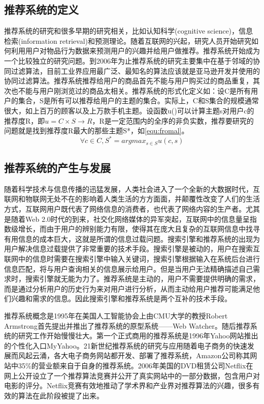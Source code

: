 	\subsection{推荐系统的定义}
	推荐系统的研究和很多早期的研究相关，比如认知科学(cognitive science)\citep{cognitive-science}，信息检索(information retrieval)和预测理论\citep{Forecast-principle}。随着互联网的兴起，研究人员开始研究如何利用用户对物品行为数据来预测用户的兴趣并给用户做推荐\citep{cf-sn}。推荐系统开始成为一个比较独立的研究问题。到2006年为止推荐系统的研究主要集中在基于邻域的协同过滤算法，目前工业界应用最广泛、最知名的算法应该就是亚马逊开发并使用的协同过滤算法\citep{Amazon-cf}。推荐系统推荐给用户的商品首先不能与用户购买过的商品重复，其次也不能与用户刚浏览过的商品太相关。推荐系统的形式化定义如：设C是所有用户的集合，S是所有可以推荐给用户的主题的集合。实际上，C和S集合的规模通常很大，如上百万的顾客以及上万款手机主题。设函数u()可以计算主题s对用户c的推荐度R，即$u=C\times S \rightarrow R$，R是一定范围内的全序的非负实数，推荐要研究的问题就是找到推荐度R最大的那些主题S*，如\autoref{equ:fromal}。
	\begin{equation}
	\forall c \in C,S^{*}=arg  max_{s \in S} u(c,s)
	\label{equ:fromal}
	\end{equation}

	\subsection{推荐系统的产生与发展}
	随着科学技术与信息传播的迅猛发展，人类社会进入了一个全新的大数据时代，互联网和物联网无处不在的影响着人类生活的方方面面，并颠覆性改变了人们的生活方式，互联网用户既代表了网络信息的消费者，也代表了网络内容的生产者。尤其是随着Web 2.0时代的到来，社交化网络媒体的异军突起，互联网中的信息量呈指数级增长，而由于用户的辨别能力有限，使得其在庞大且复杂的互联网信息中找寻有用信息的成本巨大，这就是所谓的信息过载问题\citep{info-overload, info-overload:1}。搜索引擎和推荐系统的出现为用户解决信息过载提供了非常重要的技术手段。搜索引擎是被动的，用户在搜索互联网中的信息时需要在搜索引擎中输入关键词，搜索引擎根据输入在系统后台进行信息匹配，将与用户查询相关的信息展示给用户。但是当用户无法精确描述自己需求时，搜索引擎就无能为力了。推荐系统是主动的，用户不需要提供明确的需求，而是通过分析用户的历史行为来对用户进行分析，从而主动给用户推荐可能满足他们兴趣和需求的信息。因此搜索引擎和推荐系统是两个互补的技术手段。

	推荐系统概念是1995年在美国人工智能协会\citep{recmd-history}上由CMU大学的教授Robert Armstrong首先提出并推出了推荐系统的原型系统——Web Watcher。随后推荐系统的研究工作开始慢慢壮大。第一个正式商用的推荐系统是1996年Yahoo网站推出的个性化入口MyYahoo。21新世纪推荐系统的研究与应用随着电子商务的快速发展而风起云涌，各大电子商务网站都开发、部署了推荐系统，Amazon公司称其网站中35\%的营业额来自于自身的推荐系统。2006年美国的DVD租赁公司Netflix\citep{recmd-netflix}在网上公开设立了一个推荐算法竞赛并公开了真实网站中的一部分数据，包含用户对电影的评分。Netflix竞赛有效地推动了学术界和产业界对推荐算法的兴趣，很多有效的算法在此阶段被提了出来。

